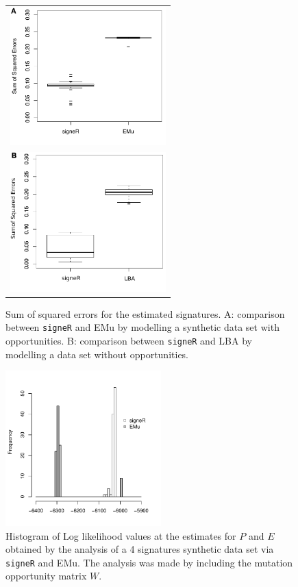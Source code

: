 \documentclass{bioinfo}
\begin{document}
\begin{figure}  
 \centering
   \begin{tabular}{c}
 \includegraphics[width=6cm]{figs/Simulation_signeR_vs_EMu_boxplot_SSE}
   \\
 \includegraphics[width=6cm]{figs/Simulation_signeR_vs_Alex_boxplot_SSE_P}
   \end{tabular}
  \caption{\textrm{%
    Sum of squared errors for the estimated signatures. A:
    comparison between \texttt{signeR} and EMu by modelling a synthetic
    data set with opportunities. B: comparison between \texttt{signeR}
    and LBA by modelling a data set without opportunities.
   }
  }
  \label{fig:synth_SSE}
\end{figure}
\begin{figure}  
 \centering
  \includegraphics[width=6cm]{figs/Simulation_signeR_vs_EMu_histogram_LLh_same_axis}
  \caption{\textrm{%
   Histogram of Log likelihood values at the estimates for $P$ and $E$
   obtained by the analysis of a 4 signatures synthetic data set via
   \texttt{signeR} and EMu. The analysis was made by including the
   mutation opportunity matrix $W$.
   }
  }
  \label{fig:synth_LLh}
\end{figure}
\end{document}
